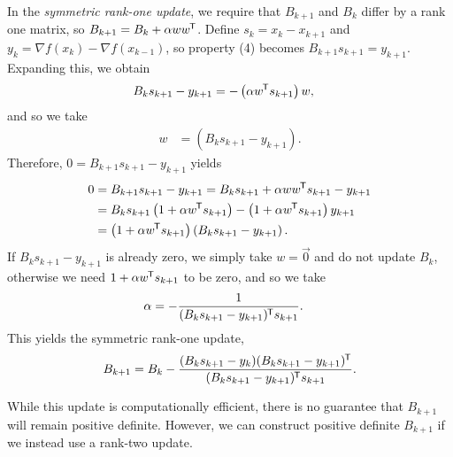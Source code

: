\begin{defn}
    In the \emph{symmetric rank-one update}, we require that $B_{k+1}$ and $B_{k}$ differ by a rank one matrix, so $B_{k+1} = B_{k} + \alpha ww^{\mkern-1.5mu\mathsf{T}}$. Define $s_k = x_k - x_{k+1}$ and $y_k = \nabla f(x_k)-\nabla f(x_{k-1})$, so property (4) becomes $B_{k+1}s_{k+1} = y_{k+1}$. Expanding this, we obtain
    \begin{align*}
        B_ks_{k+1} - y_{k+1} &= -\left(\alpha w^{\mkern-1.5mu\mathsf{T}}s_{k+1}\right)w,
    \end{align*}
    and so we take
    \begin{align*}
        w &= \left(B_{k}s_{k+1}-y_{k+1}\right).
    \end{align*}
    Therefore, $0 = B_{k+1}s_{k+1} - y_{k+1}$ yields
    \begin{align*}
        0 &= B_{k+1}s_{k+1} - y_{k+1} = B_ks_{k+1} + \alpha ww^{\mkern-1.5mu\mathsf{T}}s_{k+1} - y_{k+1} \\
        &= B_ks_{k+1}\left(1 + \alpha w^{\mkern-1.5mu\mathsf{T}}s_{k+1}\right) - \left(1 + \alpha w^{\mkern-1.5mu\mathsf{T}}s_{k+1}\right)y_{k+1} \\
        &= \left(1 + \alpha w^{\mkern-1.5mu\mathsf{T}}s_{k+1}\right)\left(B_{k}s_{k+1} - y_{k+1}\right).
    \end{align*}
    If $B_{k}s_{k+1} - y_{k+1}$ is already zero, we simply take $w = \vec{0}$ and do not update $B_k$, otherwise we need $1 + \alpha w^{\mkern-1.5mu\mathsf{T}}s_{k+1}$ to be zero, and so we take
    \begin{align*}
        \alpha &= -\frac{1}{(B_ks_{k+1} - y_{k+1})^{\mkern-1.5mu\mathsf{T}}s_{k+1}}.
    \end{align*}
    This yields the symmetric rank-one update,
    \begin{align*}
        B_{k+1}= B_k - \frac{(B_ks_{k+1}-y_k)(B_ks_{k+1}-y_{k+1})^{\mkern-1.5mu\mathsf{T}}}{(B_ks_{k+1} - y_{k+1})^{\mkern-1.5mu\mathsf{T}}s_{k+1}}.
    \end{align*}
\end{defn}

\begin{rmk}
    While this update is computationally efficient, there is no guarantee that $B_{k+1}$ will remain positive definite. However, we can construct positive definite $B_{k+1}$ if we instead use a rank-two update.
\end{rmk}

